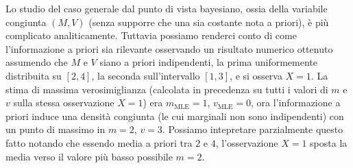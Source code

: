 \documentclass[
  italian,
  letterpaper,
]{book}
\newcommand{\mle}{\operatorname{MLE}}
\theoremstyle{definition}
\theoremstyle{remark}
\begin{document}
Lo studio del caso generale dal punto di vista bayesiano, ossia della
variabile congiunta \((M,V)\) (senza supporre che una sia costante nota
a priori), è più complicato analiticamente. Tuttavia possiamo renderci
conto di come l'informazione a priori sia rilevante osservando un
risultato numerico ottenuto assumendo che \(M\) e \(V\) siano a priori
indipendenti, la prima uniformemente distribuita su \([2,4]\), la
seconda sull'intervallo \([1, 3]\), e si osserva \(X=1\). La stima di
massima verosimiglianza (calcolata in precedenza su tutti i valori di
\(m\) e \(v\) sulla stessa osservazione \(X=1\)) era \(m_{{\mle}}=1\),
\(v_{{\mle}} = 0\), ora l'informazione a priori induce una densità
congiunta (le cui marginali non sono indipendenti) con un punto di
massimo in \(m=2\), \(v=3\). Possiamo intepretare parzialmente questo
fatto notando che essendo media a priori tra \(2\) e \(4\),
l'osservazione \(X=1\) sposta la media verso il valore più basso
possibile \(m=2\).
\end{document}
